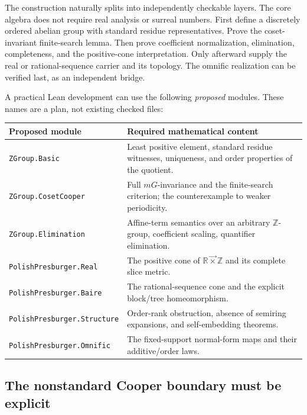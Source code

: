 \documentclass[11pt]{article}
\numberwithin{equation}{section}
\theoremstyle{definition}
\theoremstyle{remark}
\newcommand{\Z}{\mathbb Z}
\newcommand{\R}{\mathbb R}
\newcommand{\lex}{\mathbin{\overrightarrow\times}}
\begin{document}
The construction naturally splits into independently checkable layers.
The core algebra does not require real analysis or surreal numbers.
First define a discretely ordered abelian group with standard residue
representatives. Prove the coset-invariant finite-search lemma. Then
prove coefficient normalization, elimination, completeness, and the
positive-cone interpretation. Only afterward supply the real or
rational-sequence carrier and its topology. The omnific realization can
be verified last, as an independent bridge.

A practical Lean development can use the following \emph{proposed}
modules. These names are a plan, not existing checked files:
\begin{center}
\begin{tabular}{@{}>{\raggedright\arraybackslash}p{}>{\raggedright\arraybackslash}p{}@{}}
\toprule
Proposed module & Required mathematical content\\
\midrule
\texttt{ZGroup.Basic} & Least positive element, standard residue witnesses,
uniqueness, and order properties of the quotient.\\
\texttt{ZGroup.CosetCooper} & Full $mG$-invariance and the finite-search
criterion; the counterexample to weaker periodicity.\\
\texttt{ZGroup.Elimination} & Affine-term semantics over an arbitrary
$\Z$-group, coefficient scaling, quantifier elimination.\\
\texttt{PolishPresburger.}\allowbreak\texttt{Real} & The positive cone of $\R\lex\Z$ and
its complete slice metric.\\
\texttt{PolishPresburger.}\allowbreak\texttt{Baire} & The rational-sequence cone and the
explicit block/tree homeomorphism.\\
\texttt{PolishPresburger.}\allowbreak\texttt{Structure} & Order-rank obstruction, absence of
semiring expansions, and self-embedding theorems.\\
\texttt{PolishPresburger.}\allowbreak\texttt{Omnific} & The fixed-support normal-form maps and
their additive/order laws.\\
\bottomrule
\end{tabular}
\end{center}

\subsection{The nonstandard Cooper boundary must be explicit}
\end{document}
